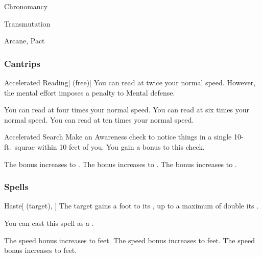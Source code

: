 \newpage
\begin{spellsection}{Chronomancy}

\begin{spellheader}
\end{spellheader}


 Transmutation

 Arcane, Pact

\subsubsection{Cantrips}


\begin{freeability}{Accelerated Reading}[ (free)]
You can read at twice your normal speed.
However, the mental effort imposes a  penalty to Mental defense.

\rankline
{} You can read at four times your normal speed.
 You can read at six times your normal speed.
 You can read at ten times your normal speed.
\end{freeability}


\begin{freeability}{Accelerated Search}
Make an Awareness check to notice things in a single 10-ft.\ squrae within 10 feet of you.
You gain a  bonus to this check.

\rankline
{} The bonus increases to .
 The bonus increases to .
 The bonus increases to .
\end{freeability}

\end{spellsection}


\subsubsection{Spells}


\lowercase{\hypertarget{spell:Haste}{}}\label{spell:Haste}
\begin{attuneability}[Rank 1]{\hypertarget{spell:Haste}{Haste}}[ (target), ]
The target gains a  foot  to its , up to a maximum of double its .

You can cast this spell as a .

\rankline
{} The speed bonus increases to  feet.
 The speed bonus increases to  feet.
 The speed bonus increases to  feet.
\end{attuneability}
\vspace{0.25em}



